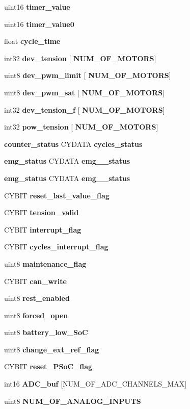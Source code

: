 \begin{DoxyCompactItemize}
\item 
uint16 \textbf{ timer\+\_\+value}
\item 
uint16 \textbf{ timer\+\_\+value0}
\item 
float \textbf{ cycle\+\_\+time}
\item 
int32 \textbf{ dev\+\_\+tension} [\textbf{ N\+U\+M\+\_\+\+O\+F\+\_\+\+M\+O\+T\+O\+RS}]
\item 
uint8 \textbf{ dev\+\_\+pwm\+\_\+limit} [\textbf{ N\+U\+M\+\_\+\+O\+F\+\_\+\+M\+O\+T\+O\+RS}]
\item 
uint8 \textbf{ dev\+\_\+pwm\+\_\+sat} [\textbf{ N\+U\+M\+\_\+\+O\+F\+\_\+\+M\+O\+T\+O\+RS}]
\item 
int32 \textbf{ dev\+\_\+tension\+\_\+f} [\textbf{ N\+U\+M\+\_\+\+O\+F\+\_\+\+M\+O\+T\+O\+RS}]
\item 
int32 \textbf{ pow\+\_\+tension} [\textbf{ N\+U\+M\+\_\+\+O\+F\+\_\+\+M\+O\+T\+O\+RS}]
\item 
\textbf{ counter\+\_\+status} C\+Y\+D\+A\+TA \textbf{ cycles\+\_\+status}
\item 
\textbf{ emg\+\_\+status} C\+Y\+D\+A\+TA \textbf{ emg\+\_\+\_\+status}
\item 
\textbf{ emg\+\_\+status} C\+Y\+D\+A\+TA \textbf{ emg\+\_\+\_\+status}
\item 
C\+Y\+B\+IT \textbf{ reset\+\_\+last\+\_\+value\+\_\+flag}
\item 
C\+Y\+B\+IT \textbf{ tension\+\_\+valid}
\item 
C\+Y\+B\+IT \textbf{ interrupt\+\_\+flag}
\item 
C\+Y\+B\+IT \textbf{ cycles\+\_\+interrupt\+\_\+flag}
\item 
uint8 \textbf{ maintenance\+\_\+flag}
\item 
C\+Y\+B\+IT \textbf{ can\+\_\+write}
\item 
uint8 \textbf{ rest\+\_\+enabled}
\item 
uint8 \textbf{ forced\+\_\+open}
\item 
uint8 \textbf{ battery\+\_\+low\+\_\+\+SoC}
\item 
uint8 \textbf{ change\+\_\+ext\+\_\+ref\+\_\+flag}
\item 
C\+Y\+B\+IT \textbf{ reset\+\_\+\+P\+So\+C\+\_\+flag}
\item 
\mbox{\label{globals_8h_a2fbad668712e226379890e1debdc9ff2}} 
int16 {\bfseries A\+D\+C\+\_\+buf} [N\+U\+M\+\_\+\+O\+F\+\_\+\+A\+D\+C\+\_\+\+C\+H\+A\+N\+N\+E\+L\+S\+\_\+\+M\+AX]
\item 
uint8 \textbf{ N\+U\+M\+\_\+\+O\+F\+\_\+\+A\+N\+A\+L\+O\+G\+\_\+\+I\+N\+P\+U\+TS}

\end{DoxyCompactItemize}
